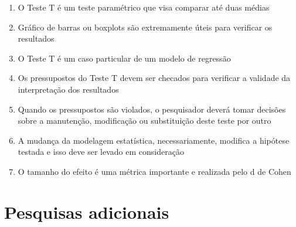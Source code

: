 \documentclass[
]{book}
\providecommand{\tightlist}{%
  \setlength{\itemsep}{0pt}\setlength{\parskip}{0pt}}
\newenvironment{explore}{
  \definecolor{shadecolor}{rgb}{0, 0, 0}  %
  \color{white}
  \begin{shaded}}
 {\end{shaded}}
\begin{document}
\begin{explore}

\begin{enumerate}
\def\labelenumi{\arabic{enumi}.}
\tightlist
\item
  O Teste T é um teste paramétrico que visa comparar até duas médias\\
\item
  Gráfico de barras ou boxplots são extremamente úteis para verificar os resultados\\
\item
  O Teste T é um caso particular de um modelo de regressão\\
\item
  Os pressupostos do Teste T devem ser checados para verificar a validade da interpretação dos resultados\\
\item
  Quando os pressupostos são violados, o pesquisador deverá tomar decisões sobre a manutenção, modificação ou substituição deste teste por outro\\
\item
  A mudança da modelagem estatística, necessariamente, modifica a hipótese testada e isso deve ser levado em consideração\\
\item
  O tamanho do efeito é uma métrica importante e realizada pelo d de Cohen\\
\end{enumerate}

\end{explore}

\hypertarget{pesquisas-adicionais-2}{%
\section{Pesquisas adicionais}\label{pesquisas-adicionais-2}}
\end{document}
